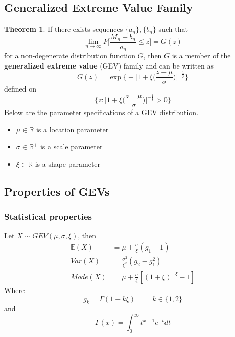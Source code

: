 \documentclass{article}
\theoremstyle{definition}
\newtheorem{theorem}{Theorem}
\theoremstyle{definition}
\def\E{\mathbb{E}}
\def\R{\mathbb{R}}
\begin{document}
\subsection{Generalized Extreme Value Family}
\begin{theorem}
If there exists sequences $\{a_n\},\{b_n\}$ such that 
\[\lim_{n\rightarrow\infty}P \bigg[\frac{M_n-b_n}{a_n}\leq z \bigg]=G(z)\tag{$\diamond$}\]
for a non-degenerate distribution function $G$, then $G$ is a member of the \textbf{generalized extreme value }(GEV) family and can be written as 
\[G(z)=\exp\bigg\{ - \bigg[1+\xi \bigg(\frac{z-\mu}{\sigma}\bigg)\bigg]^{-\frac{1}{\xi}}\bigg\}\]
defined on 
\[\{z:\bigg[1+\xi \bigg(\frac{z-\mu}{\sigma}\bigg)\bigg]^{-\frac{1}{\xi}}>0\}\]
Below are the parameter specifications of a GEV distribution.
\begin{itemize}
\item $\mu\in\R $ is a location parameter
\item $\sigma\in\R^+$ is a scale parameter
    \item $\xi\in \R$ is a shape parameter
\end{itemize}
\end{theorem}
\subsection{Properties of GEVs}
\subsubsection{Statistical properties}
Let $X\sim GEV(\mu, \sigma,\xi)$, then
\begin{align*}
    \E(X)&=\mu+\frac{\sigma}{\xi}(g_1-1)\\
    Var(X)&=\frac{\sigma^2}{\xi^2}(g_2-g_1^2)\\
    Mode(X)&=\mu+\frac{\sigma}{\xi}[(1+\xi)^{-\xi} -1]
\end{align*}
Where \[g_k=\Gamma(1-k\xi)\hspace{1cm} k\in\{1,2\}\]
and 
\[\Gamma(x)=\int_0^{\infty}t^{x-1}e^{-t}dt\]
\end{document}
